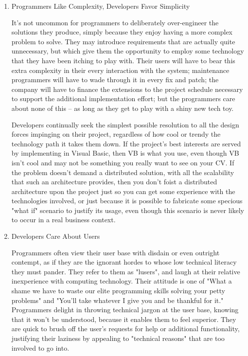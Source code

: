 \documentclass{article}
\begin{document}
\begin{enumerate}
\item Programmers Like Complexity, Developers Favor Simplicity
\label{sec:orgheadline130}

It's not uncommon for programmers to deliberately over-engineer the
solutions they produce, simply because they enjoy having a more complex
problem to solve. They may introduce requirements that are actually
quite unnecessary, but which give them the opportunity to employ some
technology that they have been itching to play with. Their users will
have to bear this extra complexity in their every interaction with the
system; maintenance programmers will have to wade through it in every
fix and patch; the company will have to finance the extensions to the
project schedule necessary to support the additional implementation
effort; but the programmers care about none of this -- as long as they
get to play with a shiny new tech toy.

Developers continually seek the simplest possible resolution to all the
design forces impinging on their project, regardless of how cool or
trendy the technology path it takes them down. If the project's best
interests are served by implementing in Visual Basic, then VB is what
you use, even though VB isn't cool and may not be something you really
want to see on your CV. If the problem doesn't demand a distributed
solution, with all the scalability that such an architecture provides,
then you don't foist a distributed architecture upon the project just so
you can get some experience with the technologies involved, or just
because it is possible to fabricate some specious "what if" scenario to
justify its usage, even though this scenario is never likely to occur in
a real business context.

\item Developers Care About Users
\label{sec:orgheadline131}

Programmers often view their user base with disdain or even outright
contempt, as if they are the ignorant hordes to whose low technical
literacy they must pander. They refer to them as "lusers", and laugh at
their relative inexperience with computing technology. Their attitude is
one of "What a shame we have to waste our elite programming skills
solving your petty problems" and "You'll take whatever I give you and be
thankful for it." Programmers delight in throwing technical jargon at
the user base, knowing that it won't be understood, because it enables
them to feel superior. They are quick to brush off the user's requests
for help or additional functionality, justifying their laziness by
appealing to "technical reasons" that are too involved to go into.


\end{enumerate}
\end{document}
